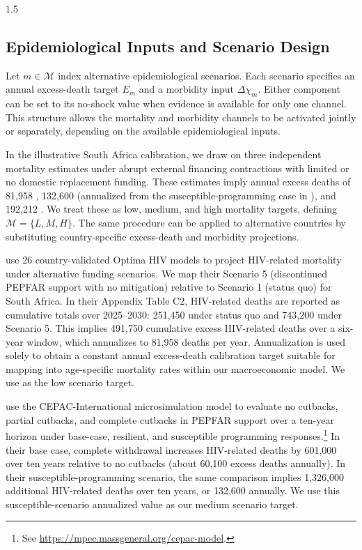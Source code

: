\documentclass[letterpaper,12pt]{article}
\theoremstyle{definition}
\begin{document}
\begin{spacing}{1.5}
\subsection{Epidemiological Inputs and Scenario Design}

Let $m \in \mathcal{M}$ index alternative epidemiological scenarios. Each scenario specifies an annual excess-death target $E_m$ and a morbidity input $\Delta \chi_m$. Either component can be set to its no-shock value when evidence is available for only one channel. This structure allows the mortality and morbidity channels to be activated jointly or separately, depending on the available epidemiological inputs.

In the illustrative South Africa calibration, we draw on three independent mortality estimates under abrupt external financing contractions with limited or no domestic replacement funding. These estimates imply annual excess deaths of 81,958 \citep{Brink2025}, 132,600 (annualized from the susceptible-programming case in \citealp{Gandhi2025}), and 192,212 \citep{KS2025}. We treat these as low, medium, and high mortality targets, defining $\mathcal{M}=\{L,M,H\}$. The same procedure can be applied to alternative countries by substituting country-specific excess-death and morbidity projections.

\citet{Brink2025} use 26 country-validated Optima HIV models to project HIV-related mortality under alternative funding scenarios. We map their Scenario 5 (discontinued PEPFAR support with no mitigation) relative to Scenario 1 (status quo) for South Africa. In their Appendix Table C2, HIV-related deaths are reported as cumulative totals over 2025--2030: 251,450 under status quo and 743,200 under Scenario 5. This implies 491,750 cumulative excess HIV-related deaths over a six-year window, which annualizes to 81,958 deaths per year. Annualization is used solely to obtain a constant annual excess-death calibration target suitable for mapping into age-specific mortality rates within our macroeconomic model. We use \citet{Brink2025} as the low scenario target.

\citet{Gandhi2025} use the CEPAC-International microsimulation model to evaluate no cutbacks, partial cutbacks, and complete cutbacks in PEPFAR support over a ten-year horizon under base-case, resilient, and susceptible programming responses.\footnote{See \href{https://mpec.massgeneral.org/cepac-model}{https://mpec.massgeneral.org/cepac-model}.} In their base case, complete withdrawal increases HIV-related deaths by 601,000 over ten years relative to no cutbacks (about 60,100 excess deaths annually). In their susceptible-programming scenario, the same comparison implies 1,326,000 additional HIV-related deaths over ten years, or 132,600 annually. We use this susceptible-scenario annualized value as our medium scenario target.


\end{spacing}
\end{document}
